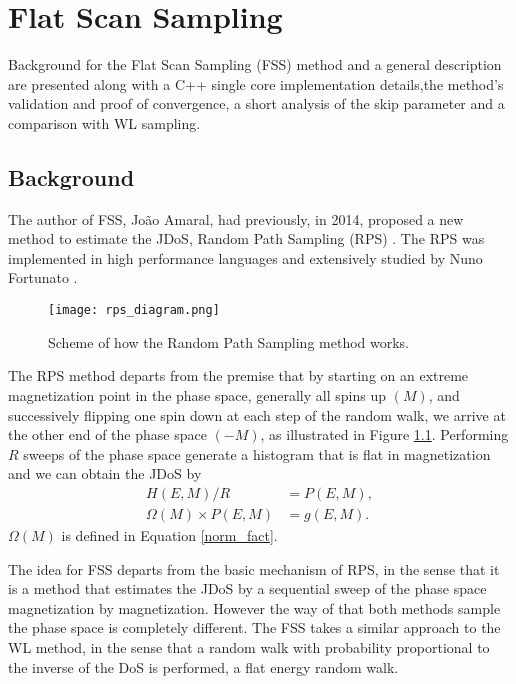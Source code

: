 \chapter{Flat Scan Sampling}

	Background for the Flat Scan Sampling (FSS) method and a general description are presented along with a C++ single core implementation details,the method's validation and proof of convergence, a short analysis of the skip parameter and a comparison with WL sampling.

\section{Background}

	The author of FSS, João Amaral, had previously, in 2014, proposed a new method to estimate the JDoS, Random Path Sampling (RPS) \cite{Amaral2014}.  The RPS was implemented in high performance languages and extensively studied by Nuno Fortunato \cite{Fortunato2015,Fortunato2016,Korotana2016}. 
	
\begin{figure}[h]
	\centering
	\texttt{[image: rps\_diagram.png]}
	\caption{Scheme of how the Random Path Sampling method works.}
	\label{rps_dia}
\end{figure}
	
	The RPS method departs from the premise that by starting on an extreme magnetization point in the phase space, generally all spins up $(M)$, and successively flipping one spin down at each step of the random walk, we arrive at the other end of the phase space $(-M)$, as illustrated in Figure \ref{rps_dia}. Performing $R$ sweeps of the phase space generate a histogram that is flat in magnetization and we can obtain the JDoS by 
\begin{align}
	H(E, M)/R &= P(E, M), \\
	\Omega(M) \times P(E, M) &= g(E, M).
\end{align}
$\Omega(M)$ is defined in Equation \ref{norm_fact}.

	The idea for FSS departs from the basic mechanism of RPS, in the sense that it is a method that estimates the JDoS by a sequential sweep of the phase space magnetization by magnetization. However the way of that both methods sample the phase space is completely different. The FSS takes a similar approach to the WL method, in the sense that a random walk with probability proportional to the inverse of the DoS is performed, a flat energy random walk.
	
